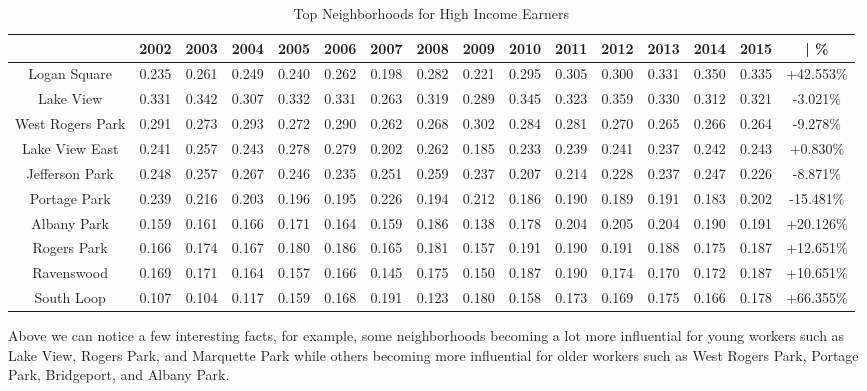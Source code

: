 \documentclass{article}
\theoremstyle{definition}
\theoremstyle{remark}
\begin{document}
\begin{table}[h]\centering
\caption{Top Neighborhoods for High Income Earners}\label{thelabel}
\begin{adjustbox}{center}
\begin{tabular}{||c | c c c c c c c c c c c c c c | c ||} 
 \hline
 & 2002 & 2003 & 2004 & 2005 & 2006 & 2007 & 2008 & 2009 & 2010 & 2011 & 2012 & 2013 & 2014 & 2015 & | \%\\[0.5ex] 
 \hline\hline
Logan Square     & 0.235 & 0.261 & 0.249 & 0.240 & 0.262 & 0.198 & 0.282 & 0.221 & 0.295 & 0.305 & 0.300 & 0.331 & 0.350 & 0.335 & +42.553\% \\
Lake View        & 0.331 & 0.342 & 0.307 & 0.332 & 0.331 & 0.263 & 0.319 & 0.289 & 0.345 & 0.323 & 0.359 & 0.330 & 0.312 & 0.321 & -3.021\% \\
West Rogers Park & 0.291 & 0.273 & 0.293 & 0.272 & 0.290 & 0.262 & 0.268 & 0.302 & 0.284 & 0.281 & 0.270 & 0.265 & 0.266 & 0.264 & -9.278\% \\
Lake View East   & 0.241 & 0.257 & 0.243 & 0.278 & 0.279 & 0.202 & 0.262 & 0.185 & 0.233 & 0.239 & 0.241 & 0.237 & 0.242 & 0.243 & +0.830\% \\
Jefferson Park   & 0.248 & 0.257 & 0.267 & 0.246 & 0.235 & 0.251 & 0.259 & 0.237 & 0.207 & 0.214 & 0.228 & 0.237 & 0.247 & 0.226 & -8.871\% \\
Portage Park     & 0.239 & 0.216 & 0.203 & 0.196 & 0.195 & 0.226 & 0.194 & 0.212 & 0.186 & 0.190 & 0.189 & 0.191 & 0.183 & 0.202 & -15.481\% \\
Albany Park      & 0.159 & 0.161 & 0.166 & 0.171 & 0.164 & 0.159 & 0.186 & 0.138 & 0.178 & 0.204 & 0.205 & 0.204 & 0.190 & 0.191 & +20.126\% \\
Rogers Park      & 0.166 & 0.174 & 0.167 & 0.180 & 0.186 & 0.165 & 0.181 & 0.157 & 0.191 & 0.190 & 0.191 & 0.188 & 0.175 & 0.187 & +12.651\% \\
Ravenswood       & 0.169 & 0.171 & 0.164 & 0.157 & 0.166 & 0.145 & 0.175 & 0.150 & 0.187 & 0.190 & 0.174 & 0.170 & 0.172 & 0.187 & +10.651\% \\
South Loop       & 0.107 & 0.104 & 0.117 & 0.159 & 0.168 & 0.191 & 0.123 & 0.180 & 0.158 & 0.173 & 0.169 & 0.175 & 0.166 & 0.178 & +66.355\% \\
 \hline
 \end{tabular}
\end{adjustbox}
\end{table}

Above we can notice a few interesting facts, for example, some neighborhoods becoming a lot more influential for young workers such as Lake View, Rogers Park, and Marquette Park while others becoming more influential for older workers such as West Rogers Park, Portage Park, Bridgeport, and Albany Park. \\
\end{document}
